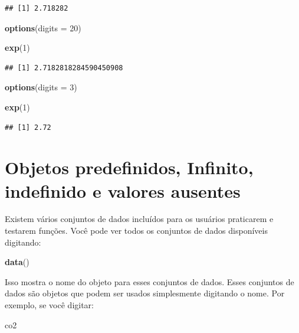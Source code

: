 \documentclass[
]{book}
\newenvironment{Shaded}{\begin{snugshade}}{\end{snugshade}}
\newcommand{\AttributeTok}[1]{\textcolor[rgb]{0.13,0.29,0.53}{#1}}
\newcommand{\DecValTok}[1]{\textcolor[rgb]{0.00,0.00,0.81}{#1}}
\newcommand{\FunctionTok}[1]{\textcolor[rgb]{0.13,0.29,0.53}{\textbf{#1}}}
\newcommand{\NormalTok}[1]{#1}
\begin{document}
\begin{verbatim}
## [1] 2.718282
\end{verbatim}

\begin{Shaded}
\begin{Highlighting}[]
\FunctionTok{options}\NormalTok{(}\AttributeTok{digits =} \DecValTok{20}\NormalTok{)}

\FunctionTok{exp}\NormalTok{(}\DecValTok{1}\NormalTok{)}
\end{Highlighting}
\end{Shaded}

\begin{verbatim}
## [1] 2.7182818284590450908
\end{verbatim}

\begin{Shaded}
\begin{Highlighting}[]
\FunctionTok{options}\NormalTok{(}\AttributeTok{digits =} \DecValTok{3}\NormalTok{)}

\FunctionTok{exp}\NormalTok{(}\DecValTok{1}\NormalTok{)}
\end{Highlighting}
\end{Shaded}

\begin{verbatim}
## [1] 2.72
\end{verbatim}

\section{Objetos predefinidos, Infinito, indefinido e valores ausentes}\label{objetos-predefinidos-infinito-indefinido-e-valores-ausentes}

Existem vários conjuntos de dados incluídos para os usuários praticarem e testarem funções. Você pode ver todos os conjuntos de dados disponíveis digitando:

\begin{Shaded}
\begin{Highlighting}[]
\FunctionTok{data}\NormalTok{()}
\end{Highlighting}
\end{Shaded}

Isso mostra o nome do objeto para esses conjuntos de dados. Esses conjuntos de dados são objetos que podem ser usados simplesmente digitando o nome. Por exemplo, se você digitar:

\begin{Shaded}
\begin{Highlighting}[]
\NormalTok{co2}
\end{Highlighting}
\end{Shaded}
\end{document}
